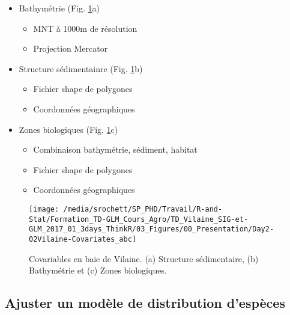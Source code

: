 \documentclass[french,a4paper]{article}
\providecommand{\tightlist}{%
  \setlength{\itemsep}{0pt}\setlength{\parskip}{0pt}}
\begin{document}
\begin{itemize}
\tightlist
\item
  Bathymétrie (Fig. \ref{fig:figCovariates}a)

  \begin{itemize}
  \tightlist
  \item
    MNT à 1000m de résolution
  \item
    Projection Mercator
  \end{itemize}
\item
  Structure sédimentainre (Fig. \ref{fig:figCovariates}b)

  \begin{itemize}
  \tightlist
  \item
    Fichier shape de polygones
  \item
    Coordonnées géographiques
  \end{itemize}
\item
  Zones biologiques (Fig. \ref{fig:figCovariates}c)

  \begin{itemize}
  \tightlist
  \item
    Combinaison bathymétrie, sédiment, habitat
  \item
    Fichier shape de polygones
  \item
    Coordonnées géographiques
  \end{itemize}
\end{itemize}




\begin{figure}[!h]

{\centering \texttt{[image: /media/srochett/SP\_PHD/Travail/R-and-Stat/Formation\_TD-GLM\_Cours\_Agro/TD\_Vilaine\_SIG-et-GLM\_2017\_01\_3days\_ThinkR/03\_Figures/00\_Presentation/Day2-02Vilaine-Covariates\_abc]} 

}

\caption{Covariables en baie de Vilaine. (a) Structure
sédimentaire, (b) Bathymétrie et (c) Zones biologiques.}\label{fig:figCovariates}
\end{figure}

\hypertarget{ajuster-un-modele-de-distribution-despeces}{%
\subsection{Ajuster un modèle de distribution
d'espèces}\label{ajuster-un-modele-de-distribution-despeces}}
\end{document}
